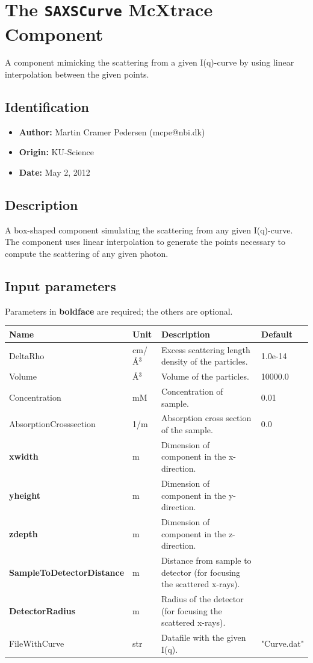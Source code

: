 \section{The \texttt{SAXSCurve} McXtrace Component}
A component mimicking the scattering from a given I(q)-curve by using
linear interpolation between the given points.

\subsection*{Identification}
\begin{itemize}
  \item \textbf{Author:} Martin Cramer Pedersen (mcpe@nbi.dk)
  \item \textbf{Origin:} KU-Science
  \item \textbf{Date:} May 2, 2012
\end{itemize}

\subsection*{Description}
A box-shaped component simulating the scattering from any given I(q)-curve. The component uses linear interpolation to generate the points necessary to compute the scattering of any given photon.

\subsection*{Input parameters}
Parameters in \textbf{boldface} are required; the others are optional.

\begin{longtable}{p{}p{}p{}p{}}
\toprule
\textbf{Name} & \textbf{Unit} & \textbf{Description} & \textbf{Default} \\
\midrule
\endhead
DeltaRho & cm/\AA{}$^{3}$ & Excess scattering length density of the particles. & 1.0e-14 \\
Volume & \AA{}$^{3}$ & Volume of the particles. & 10000.0 \\
Concentration & mM & Concentration of sample. & 0.01 \\
AbsorptionCrosssection & 1/m & Absorption cross section of the sample. & 0.0 \\
\textbf{xwidth} & m & Dimension of component in the x-direction. &  \\
\textbf{yheight} & m & Dimension of component in the y-direction. &  \\
\textbf{zdepth} & m & Dimension of component in the z-direction. &  \\
\textbf{SampleToDetectorDistance} & m & Distance from sample to detector (for focusing the scattered x-rays). &  \\
\textbf{DetectorRadius} & m & Radius of the detector (for focusing the scattered x-rays). &  \\
FileWithCurve & str & Datafile with the given I(q). & "Curve.dat" \\
\bottomrule
\end{longtable}

